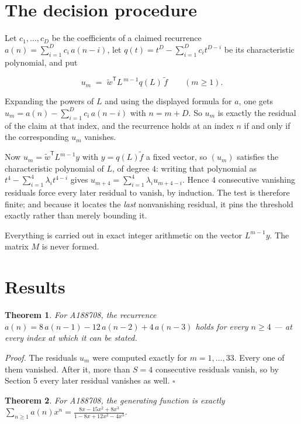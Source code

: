 \documentclass[11pt]{article}
\newtheorem{theorem}{Theorem}
\theoremstyle{definition}
\begin{document}
\section{The decision procedure}

Let $c_1,\dots,c_D$ be the coefficients of a claimed recurrence $a(n) = \sum_{i=1}^{D} c_i\,a(n-i)$, let $q(t) = t^{D} - \sum_{i=1}^{D} c_i t^{D-i}$ be its characteristic polynomial, and put

\[u_m \;=\; \tilde w^{\mathsf T} L^{\,m-1} q(L)\,\tilde f \qquad (m \ge 1).\]

Expanding the powers of $L$ and using the displayed formula for $a$, one gets $u_m = a(n) - \sum_{i=1}^{D} c_i\,a(n-i)$ with $n = m + D$. So $u_m$ is exactly the residual of the claim at that index, and the recurrence holds at an index $n$ if and only if the corresponding $u_m$ vanishes.

Now $u_m = \tilde w^{\mathsf T} L^{m-1} y$ with $y = q(L)\tilde f$ a fixed vector, so $(u_m)$ satisfies the characteristic polynomial of $L$, of degree $4$: writing that polynomial as $t^{4} - \sum_{i=1}^{4} \lambda_i t^{4-i}$ gives $u_{m+4} = \sum_{i=1}^{4} \lambda_i u_{m+4-i}$. Hence $4$ consecutive vanishing residuals force every later residual to vanish, by induction. The test is therefore finite; and because it locates the {\itshape last} nonvanishing residual, it pins the threshold exactly rather than merely bounding it.

Everything is carried out in exact integer arithmetic on the vector $L^{m-1}y$. The matrix $M$ is never formed.

\section{Results}

\begin{theorem} For A188708, the recurrence $a(n) = 8\,a(n-1) - 12\,a(n-2) + 4\,a(n-3)$ holds for every $n \ge 4$ --- at every index at which it can be stated.\end{theorem}

{\itshape Proof.} The residuals $u_m$ were computed exactly for $m = 1,\dots,33$. Every one of them vanished. After it, more than $S = 4$ consecutive residuals vanish, so by Section 5 every later residual vanishes as well. $\square$

\begin{theorem} For A188708, the generating function is exactly $\sum_{n\ge 1} a(n)x^n = \frac{8x - 15x^{2} + 8x^{3}}{1 - 8x + 12x^{2} - 4x^{3}}$.\end{theorem}
\end{document}
